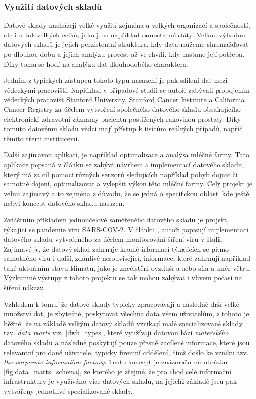 \documentclass[
  digital,     %
  twoside,     %
  lof,         %
  lot,         %
]{fithesis4}
\begin{document}
\subsubsection{Využití datových skladů}
Datové sklady nacházejí velké využití zejména u velkých organizací a společností, ale i u tak velkých celků, jako jsou například samostatné státy. Velkou výhodou datových skladů je jejich perzistentní struktura, kdy data můžeme shromažďovat po dlouhou dobu a jejich analýzu provést až ve chvíli, kdy nastane její potřeba. Díky tomu se hodí na analýzu dat dlouhodobého charakteru.

Jedním z typických zástupců tohoto typu nasazení je pak sdílení dat mezi vědeckými pracovišti. Například v případové studii  \parencite{Seneviratne20180124} se autoři zabývali propojením vědeckých pracovišť Stanford University, Stanford Cancer Institute a California Cancer Registry za účelem vytvoření společného datového skladu obsahujícího elektronické zdravotní záznamy pacientů postižených rakovinou prostaty. Díky tomuto datovému skladu vědci mají přístup k tisícům reálných případů, napříč těmito třemi institucemi.

Další zajímavou aplikací, je například optimalizace a analýza mléčné farmy. Tato aplikace popsaná v článku  \parencite{Schuetz20180326} se zabývá návrhem a implementací datového skladu, který má za cíl pomocí různých senzorů sledujících například pohyb dojnic či samotné dojení, optimalizovat a vylepšit výkon této mléčné farmy. Celý projekt je velmi zajímavý a to zejména z důvodu, že se jedná o specifickou oblast, kde ještě nebyl koncept datového skladu nasazen.

Zvláštním příkladem jednoúčelově zaměřeného datového skladu je projekt, týkající se pandemie viru SARS-COV-2. V článku  \parencite{Agapito2020}, autoři popisují implementaci datového skladu vytvořeného za účelem monitorování šíření viru v Itálii. Zajímavé je, že datový sklad zahrnuje kromě informací týkajících se přímo samotného viru i další, zdánlivě nesouvisející, informace, které zahrnují například také aktuálním stavu klimatu, jako je znečistěni ovzduší a nebo síla a směr větru. Výzkumné výstupy z tohoto projektu se tak mohou zabývat i vlivem počasí na šíření nákazy. 


Vzhledem k tomu, že datové sklady typicky zpracovávají a následně drží velké množství dat, je zbytečné, poskytovat všechna data všem uživatelům, z tohoto je běžné, že na základě velkým datový skladů vznikají malé specializované sklady tzv. \emph{data marts} viz. \ref{dwh_types}, které využívají datovou bázi \emph{mateřského} datového skladu a následně poskytují pouze přesně zacílené informace, které jsou relevantní pro dané uživatele, typicky firemní oddělení, čímž došlo ke vzniku tzv. \emph{the corporate information factory}.\parencite{Inmon2021} Tento koncept je znázorněn na obrázku \ref{fig:data_marts_schema}, ze kterého je zřejmé, že pro chod celé informační infrastruktury je využíváno více datových skladů, na jejichž základě jsou pak vytvářeny jednotlivé specializované sklady.
\end{document}
